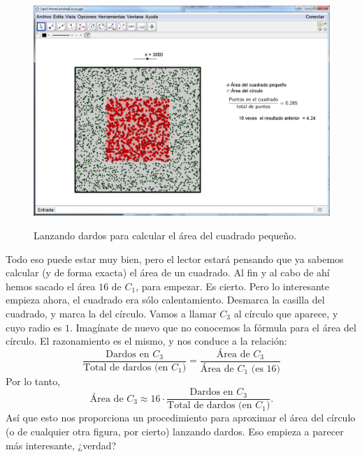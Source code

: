 \documentclass[10pt,a4paper]{article}\usepackage[]{graphicx}\usepackage[]{color}
\begin{document}
\begin{figure}[htbp]
\begin{center}
\includegraphics[width=15cm]{./fig/Tut03-45.png}\\[3mm]
\end{center}
\caption{Lanzando dardos para calcular el área del cuadrado pequeño.}
\label{tut03:fig:MontecarloAreaCirculo02}
\end{figure}
Todo eso puede estar muy bien, pero el lector estará pensando que ya sabemos calcular (y de forma exacta) el área de un cuadrado. Al fin y al cabo de ahí hemos sacado el área  $16$ de $C_1$, para empezar. Es cierto. Pero lo interesante empieza ahora, el cuadrado era sólo calentamiento. Desmarca la casilla del cuadrado, y marca la del círculo. Vamos a llamar $C_3$ al círculo que aparece, y cuyo radio es $1$. Imagínate de nuevo que no conocemos la fórmula para el área del círculo.   El razonamiento es el mismo, y nos conduce a la relación:
     \[
          \dfrac{\mbox{Dardos en $C_3$}}{\mbox{Total de dardos (en $C_1$)}} =
               \dfrac{\mbox{Área de $C_3$}}{\mbox{Área de $C_1$ (es 16)}}
          \]
Por lo tanto,
\[
     \mbox{Área de $C_3$}\approx 16\cdot \dfrac{\mbox{Dardos en $C_3$}}{\mbox{Total de dardos (en $C_1$)}}.
     \]
Así que esto nos proporciona un procedimiento para aproximar el área del círculo (o de cualquier otra figura, por cierto) lanzando dardos. Eso empieza a parecer más interesante, ¿verdad?
\end{document}

